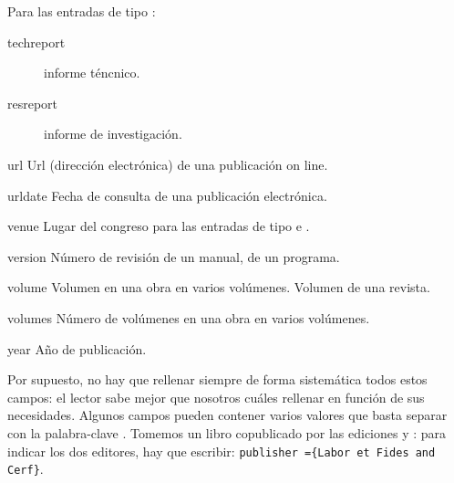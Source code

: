 \begin{choix}
					Para las entradas de tipo : \nopagebreak
					\begin{description}
						\item[techreport]informe
                                                  téncnico.
						\item[resreport]informe
                                                  de investigación.
					\end{description}
					
	\item[url] Url (dirección electrónica) de una publicación on line. 
   	\item[urldate] Fecha de consulta de una publicación electrónica. 
   	\item[venue] Lugar del congreso para las entradas de tipo  e . 
   	\item[version] Número de revisión de un manual, de un programa. 
   	\item[volume] Volumen en una obra en varios volúmenes. Volumen
          de una revista. 
   	\item[volumes] Número de volúmenes en una obra en varios volúmenes. 
   	\item[year] Año de publicación. 				
\end{choix}


Por supuesto, no hay que rellenar siempre de forma sistemática todos
estos campos: el lector sabe mejor que nosotros cuáles rellenar en
función de sus necesidades. Algunos campos pueden contener varios
valores que basta separar con la palabra-clave . Tomemos un
libro copublicado por las ediciones  y
: para indicar los dos editores, hay que escribir:
\verb|publisher ={Labor et Fides and Cerf}|.



